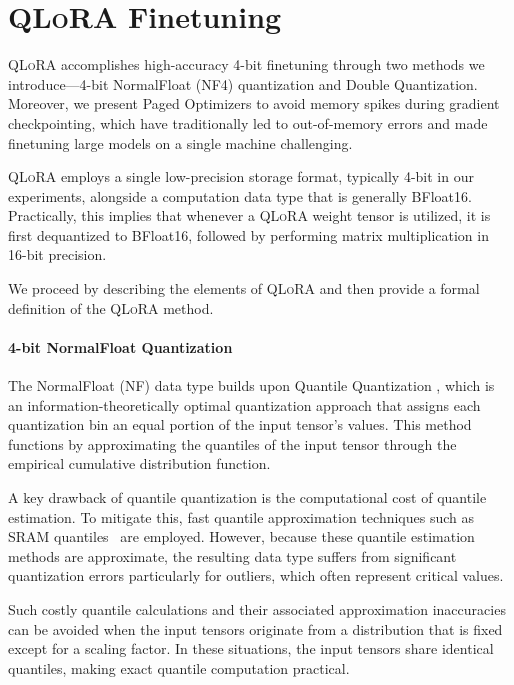\section{\textsc{QLoRA} Finetuning}

\textsc{QLoRA} accomplishes high-accuracy 4-bit finetuning through two methods we introduce—4-bit NormalFloat (NF4) quantization and Double Quantization. Moreover, we present Paged Optimizers to avoid memory spikes during gradient checkpointing, which have traditionally led to out-of-memory errors and made finetuning large models on a single machine challenging.

\textsc{QLoRA} employs a single low-precision storage format, typically 4-bit in our experiments, alongside a computation data type that is generally BFloat16. Practically, this implies that whenever a \textsc{QLoRA} weight tensor is utilized, it is first dequantized to BFloat16, followed by performing matrix multiplication in 16-bit precision.

We proceed by describing the elements of \textsc{QLoRA} and then provide a formal definition of the \textsc{QLoRA} method.

\paragraph{4-bit NormalFloat Quantization} The NormalFloat (NF) data type builds upon Quantile Quantization \citep{dettmers2022optimizers}, which is an information-theoretically optimal quantization approach that assigns each quantization bin an equal portion of the input tensor’s values. This method functions by approximating the quantiles of the input tensor through the empirical cumulative distribution function.

A key drawback of quantile quantization is the computational cost of quantile estimation. To mitigate this, fast quantile approximation techniques such as SRAM quantiles~\citep{dettmers2022optimizers} are employed. However, because these quantile estimation methods are approximate, the resulting data type suffers from significant quantization errors particularly for outliers, which often represent critical values.

Such costly quantile calculations and their associated approximation inaccuracies can be avoided when the input tensors originate from a distribution that is fixed except for a scaling factor. In these situations, the input tensors share identical quantiles, making exact quantile computation practical.

